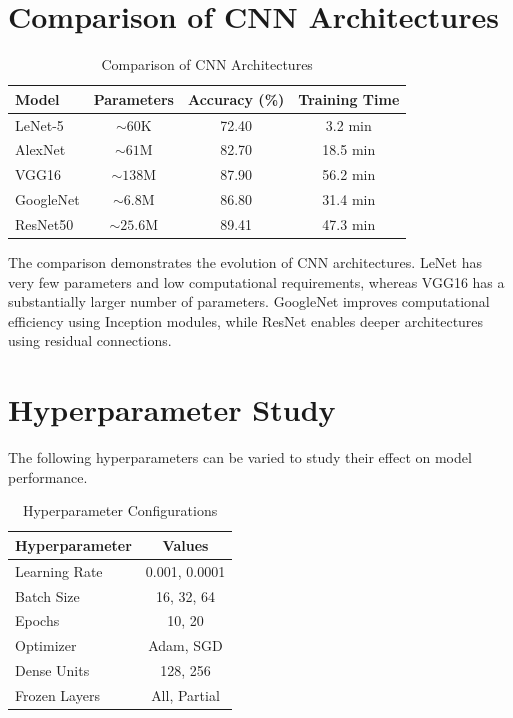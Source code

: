 \documentclass[12pt,a4paper]{article}
\begin{document}

\section{Comparison of CNN Architectures}

\begin{table}[H]
\centering
\caption{Comparison of CNN Architectures}
\begin{tabular}{lccc}
\toprule
\textbf{Model} & \textbf{Parameters} & \textbf{Accuracy (\%)} & \textbf{Training Time} \\
\midrule
LeNet-5 & $\sim60$K & 72.40 & 3.2 min \\
AlexNet & $\sim61$M & 82.70 & 18.5 min \\
VGG16 & $\sim138$M & 87.90 & 56.2 min \\
GoogleNet & $\sim6.8$M & 86.80 & 31.4 min \\
ResNet50 & $\sim25.6$M & 89.41 & 47.3 min \\
\bottomrule
\end{tabular}
\end{table}

The comparison demonstrates the evolution of CNN architectures. LeNet has very few parameters and low computational requirements, whereas VGG16 has a substantially larger number of parameters. GoogleNet improves computational efficiency using Inception modules, while ResNet enables deeper architectures using residual connections.


\section{Hyperparameter Study}

The following hyperparameters can be varied to study their effect on model performance.

\begin{table}[H]
\centering
\caption{Hyperparameter Configurations}
\begin{tabular}{lc}
\toprule
\textbf{Hyperparameter} & \textbf{Values} \\
\midrule
Learning Rate & 0.001, 0.0001 \\
Batch Size & 16, 32, 64 \\
Epochs & 10, 20 \\
Optimizer & Adam, SGD \\
Dense Units & 128, 256 \\
Frozen Layers & All, Partial \\
\bottomrule
\end{tabular}
\end{table}
\end{document}
